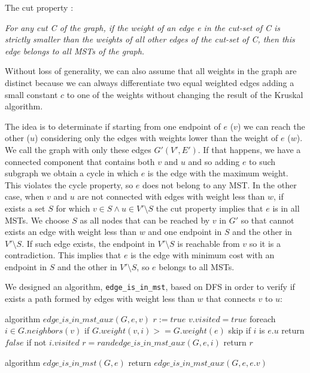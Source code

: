 \documentclass[paper=a4, fontsize=11pt]{scrartcl} %
\numberwithin{equation}{section} %
\numberwithin{figure}{section} %
\numberwithin{table}{section} %
\begin{document}
The cut property \cite{cut_prop}:

\bigskip
{\em For any cut C of the graph, if the weight of an edge e in the cut-set of C is strictly smaller than the weights of all other edges of the cut-set of C, then this edge belongs to all MSTs of the graph.} 
\bigskip

Without loss of generality, we can also assume that all weights in the graph are distinct because we can always differentiate two equal weighted edges adding a small constant $c$ to one of the weights without changing the result of the Kruskal algorithm.

The idea is to determinate if starting from one endpoint of $e$ ($v$) we can reach the other ($u$) considering only the edges with weights lower than the weight of $e$ ($w$).
We call the graph with only these edges $G'(V', E')$.
If that happens, we have a connected component that contains both $v$ and $u$ and so adding $e$ to such subgraph we obtain a cycle in which $e$ is the edge with the maximum weight. This violates the cycle property, so $e$ does not belong to any MST.
In the other case, when $v$ and $u$ are not connected with edges with weight less than $w$, if exists a set $S$ for which $v \in S \land u \in V' \setminus S$ the cut property implies that $e$ is in all MSTs.
We choose $S$ as all nodes that can be reached by $v$ in $G'$ so that cannot exists an edge with weight less than $w$ and one endpoint in $S$ and the other in $V' \setminus S$. If such edge exists, the endpoint in $V' \setminus S$ is reachable from $v$ so it is a contradiction.
This implies that $e$ is the edge with minimum cost with an endpoint in $S$ and the other in $V' \setminus S$, so $e$ belongs to all MSTs.

We designed an algorithm, \verb|edge_is_in_mst|, based on DFS in order to verify if exists a path formed by edges with weight less than $w$ that connects $v$ to $u$:

\begin{pseudo}
algorithm $edge\_is\_in\_mst\_aux(G, e, v)$
    $r := true$
    $v.visited = true$
    foreach $i \in G.neighbors(v)$
        if $G.weight(v, i) >= G.weight(e)$
            skip
        if $i$ is $e.u$
            return $false$
        if not $i.visited$
            $r = r and edge\_is\_in\_mst\_aux(G, e, i)$
    return $r$
\end{pseudo}
\begin{pseudo}
algorithm $edge\_is\_in\_mst(G, e)$
    return $edge\_is\_in\_mst\_aux(G, e, e.v)$
\end{pseudo}
\end{document}
